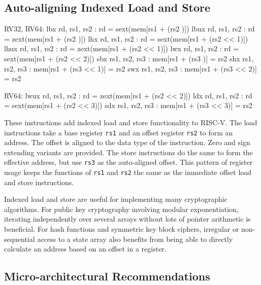 
\subsection{Auto-aligning Indexed Load and Store}
\label{sec:ildst}

\begin{cryptoisa}
RV32, RV64:
    lbx     rd,  rs1, rs2 : rd = sext(mem[rs1 + (rs2     )])
    lbux    rd,  rs1, rs2 : rd = zext(mem[rs1 + (rs2     )])
    lhx     rd,  rs1, rs2 : rd = sext(mem[rs1 + (rs2 << 1)])
    lhux    rd,  rs1, rs2 : rd = zext(mem[rs1 + (rs2 << 1)])
    lwx     rd,  rs1, rs2 : rd = sext(mem[rs1 + (rs2 << 2)])
    sbx     rs1, rs2, rs3 : mem[rs1 + (rs3     )] = rs2
    shx     rs1, rs2, rs3 : mem[rs1 + (rs3 << 1)] = rs2
    swx     rs1, rs2, rs3 : mem[rs1 + (rs3 << 2)] = rs2

RV64:
    lwux    rd,  rs1, rs2 : rd = zext(mem[rs1 + (rs2 << 2)])
    ldx     rd,  rs1, rs2 : rd = sext(mem[rs1 + (rs2 << 3)])
    sdx     rs1, rs2, rs3 : mem[rs1 + (rs3 << 3)] = rs2
\end{cryptoisa}


These instructions add indexed load and store functionality to RISC-V.
The load instructions take a base register {\tt rs1} and an offset
register {\tt rs2} to form an address.
The offset is aligned to the data type of the instruction.
Zero and sign extending variants are provided.
The store instructions do the same to form the effective address, but
use {\tt rs3} as the auto-aligned offset.
This pattern of register usage keeps the functions of {\tt rs1} and
{\tt rs2} the same as the immediate offset load and store instructions.

Indexed load and store are useful for implementing many cryptographic
algorithms.
For public key cryptography involving modular exponentiation, iterating
independently over several arrays without lots of pointer arithmetic
is beneficial.
For hash functions and symmetric key block ciphers, irregular or
non-sequential access to a state array also benefits from
being able to directly calculate an address based on an offset in a
register.


\subsection{Micro-architectural Recommendations}



